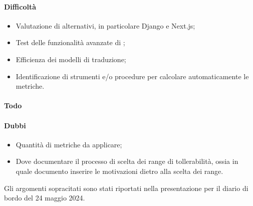 \paragraph{Difficoltà}
\begin{itemize}
	\item Valutazione di  alternativi, in particolare Django e Next.js;
	\item Test delle funzionalità avanzate di ;
	\item Efficienza dei modelli di traduzione;
	\item Identificazione di strumenti e/o procedure per calcolare automaticamente le metriche.
\end{itemize}	
\paragraph{Todo}
\paragraph{Dubbi}
\begin{itemize}
	\item Quantità di metriche da applicare;
	\item Dove documentare il processo di scelta dei range di tollerabilità, ossia in quale documento inserire le motivazioni dietro alla scelta dei range.
\end{itemize}

\par Gli argomenti sopracitati sono stati riportati nella presentazione per il diario di bordo del 24 maggio 2024.
